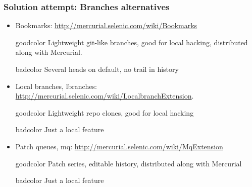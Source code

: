 \documentclass{beamer}
\begin{document}
\begin{frame} 
\frametitle{Solution attempt: Branches alternatives}
\begin{itemize}
\item Bookmarks: \url{http://mercurial.selenic.com/wiki/Bookmarks}
\begin{beamercolorbox}[rounded=true,center,shadow=true, wd=0.9\textwidth]{goodcolor}
Lightweight git-like branches, good for local hacking, distributed along with Mercurial. 
\end{beamercolorbox}
\begin{beamercolorbox}[rounded=true,center,shadow=true, wd=0.9\textwidth]{badcolor}
Several heads on default, no trail in history
\end{beamercolorbox}
\item Local branches, lbranches: \url{http://mercurial.selenic.com/wiki/LocalbranchExtension}. 
\begin{beamercolorbox}[rounded=true,center,shadow=true, wd=0.9\textwidth]{goodcolor}
Lightweight repo clones, good for local hacking
\end{beamercolorbox}
\begin{beamercolorbox}[rounded=true,center,shadow=true, wd=0.9\textwidth]{badcolor}
Just a local feature
\end{beamercolorbox}
\item Patch queues, mq: \url{http://mercurial.selenic.com/wiki/MqExtension} 
\begin{beamercolorbox}[rounded=true,center,shadow=true, wd=0.9\textwidth]{goodcolor}
Patch series, editable history, distributed along with Mercurial
\end{beamercolorbox}
\begin{beamercolorbox}[rounded=true,center,shadow=true, wd=0.9\textwidth]{badcolor}
Just a local feature
\end{beamercolorbox}
\end{itemize}
\end{frame}
\end{document}
